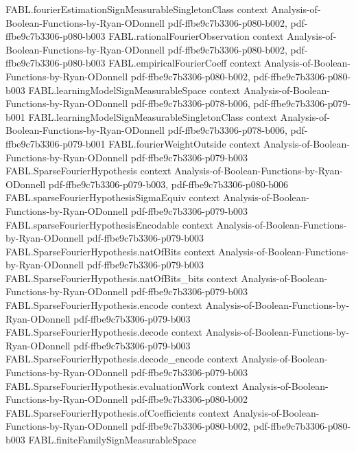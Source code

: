 \begin{theorem}
\proofstep
  {FABL.fourierEstimationSignMeasurableSingletonClass}
  {context}
  {Analysis-of-Boolean-Functions-by-Ryan-ODonnell}
  {pdf-ffbe9c7b3306-p080-b002,
    pdf-ffbe9c7b3306-p080-b003}
\proofstep
  {FABL.rationalFourierObservation}
  {context}
  {Analysis-of-Boolean-Functions-by-Ryan-ODonnell}
  {pdf-ffbe9c7b3306-p080-b002,
    pdf-ffbe9c7b3306-p080-b003}
\proofstep
  {FABL.empiricalFourierCoeff}
  {context}
  {Analysis-of-Boolean-Functions-by-Ryan-ODonnell}
  {pdf-ffbe9c7b3306-p080-b002,
    pdf-ffbe9c7b3306-p080-b003}
\proofstep
  {FABL.learningModelSignMeasurableSpace}
  {context}
  {Analysis-of-Boolean-Functions-by-Ryan-ODonnell}
  {pdf-ffbe9c7b3306-p078-b006,
    pdf-ffbe9c7b3306-p079-b001}
\proofstep
  {FABL.learningModelSignMeasurableSingletonClass}
  {context}
  {Analysis-of-Boolean-Functions-by-Ryan-ODonnell}
  {pdf-ffbe9c7b3306-p078-b006,
    pdf-ffbe9c7b3306-p079-b001}
\proofstep
  {FABL.fourierWeightOutside}
  {context}
  {Analysis-of-Boolean-Functions-by-Ryan-ODonnell}
  {pdf-ffbe9c7b3306-p079-b003}
\proofstep
  {FABL.SparseFourierHypothesis}
  {context}
  {Analysis-of-Boolean-Functions-by-Ryan-ODonnell}
  {pdf-ffbe9c7b3306-p079-b003,
    pdf-ffbe9c7b3306-p080-b006}
\proofstep
  {FABL.sparseFourierHypothesisSigmaEquiv}
  {context}
  {Analysis-of-Boolean-Functions-by-Ryan-ODonnell}
  {pdf-ffbe9c7b3306-p079-b003}
\proofstep
  {FABL.sparseFourierHypothesisEncodable}
  {context}
  {Analysis-of-Boolean-Functions-by-Ryan-ODonnell}
  {pdf-ffbe9c7b3306-p079-b003}
\proofstep
  {FABL.SparseFourierHypothesis.natOfBits}
  {context}
  {Analysis-of-Boolean-Functions-by-Ryan-ODonnell}
  {pdf-ffbe9c7b3306-p079-b003}
\proofstep
  {FABL.SparseFourierHypothesis.natOfBits_bits}
  {context}
  {Analysis-of-Boolean-Functions-by-Ryan-ODonnell}
  {pdf-ffbe9c7b3306-p079-b003}
\proofstep
  {FABL.SparseFourierHypothesis.encode}
  {context}
  {Analysis-of-Boolean-Functions-by-Ryan-ODonnell}
  {pdf-ffbe9c7b3306-p079-b003}
\proofstep
  {FABL.SparseFourierHypothesis.decode}
  {context}
  {Analysis-of-Boolean-Functions-by-Ryan-ODonnell}
  {pdf-ffbe9c7b3306-p079-b003}
\proofstep
  {FABL.SparseFourierHypothesis.decode_encode}
  {context}
  {Analysis-of-Boolean-Functions-by-Ryan-ODonnell}
  {pdf-ffbe9c7b3306-p079-b003}
\proofstep
  {FABL.SparseFourierHypothesis.evaluationWork}
  {context}
  {Analysis-of-Boolean-Functions-by-Ryan-ODonnell}
  {pdf-ffbe9c7b3306-p080-b002}
\proofstep
  {FABL.SparseFourierHypothesis.ofCoefficients}
  {context}
  {Analysis-of-Boolean-Functions-by-Ryan-ODonnell}
  {pdf-ffbe9c7b3306-p080-b002,
    pdf-ffbe9c7b3306-p080-b003}
\proofstep
  {FABL.finiteFamilySignMeasurableSpace}

\end{theorem}
